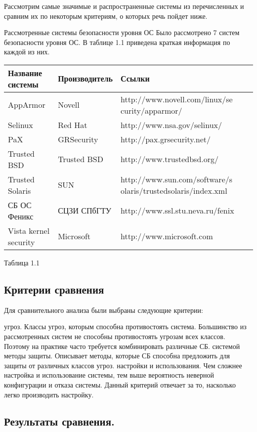 \bigskip
Рассмотрим самые значимые и распространенные системы из
 перечисленных и сравним их по некоторым критериям, о 
которых речь пойдет ниже.


Рассмотренные системы безопасности уровня ОС 
Было рассмотрено 7 систем безопасности уровня ОС. 
В таблице 1.1 приведена краткая информация по каждой из них. 

\bigskip
\begin{tabular}{|p{4cm}|p{3cm}|p{6cm}|}
\hline
Название системы & Производитель & Ссылки \\
\hline
AppArmor & Novell & http://www.novell.com/linux/se
curity/apparmor/ \\
\hline
Selinux & Red Hat & http://www.nsa.gov/selinux/\\
\hline
PaX & GRSecurity & http://pax.grsecurity.net/\\
\hline
Trusted BSD & Trusted BSD & http://www.trustedbsd.org/\\
\hline 
Trusted Solaris & SUN & http://www.sun.com/software/s
olaris/trustedsolaris/index.xml\\
\hline
СБ ОС Феникс & СЦЗИ СПбГТУ & http://www.ssl.stu.neva.ru/fenix\\
\hline
Vista kernel security & Microsoft & http://www.microsoft.com\\
\hline
\end{tabular}
Таблица 1.1
\bigskip 
\subsection{Критерии сравнения}

Для сравнительного анализа были выбраны следующие критерии: 
\begin{itemize}
	 угроз. Классы угроз, которым способна 
	противостоять система. Большинство из рассмотренных
	систем не способны противостоять угрозам всех классов. 
	Поэтому на практике часто требуется комбинировать различные СБ. 
	 системой методы защиты. Описывает 
	методы, которые СБ способна предложить для защиты от 
	различных классов угроз. 
	 настройки и использования. Чем сложнее
	настройка и использование системы, тем выше вероятность 
	неверной конфигурации и отказа системы. Данный критерий 
	отвечает за то, насколько легко производить настройку. 
\end{itemize}

\bigskip
\subsection{Результаты сравнения.} 

